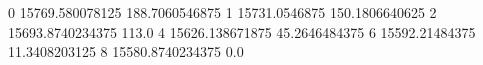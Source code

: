 0 15769.580078125 188.7060546875
1 15731.0546875 150.1806640625
2 15693.8740234375 113.0
4 15626.138671875 45.2646484375
6 15592.21484375 11.3408203125
8 15580.8740234375 0.0
